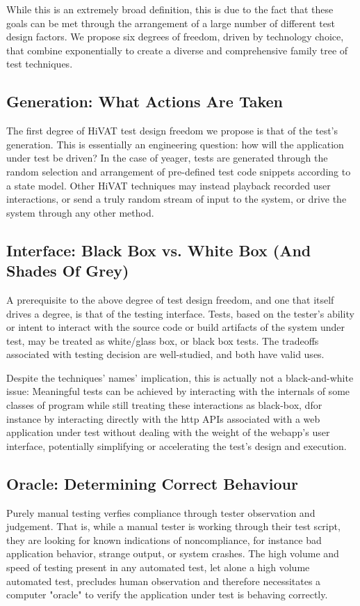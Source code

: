 While this is an extremely broad definition, this is due to the fact that these goals can be met through the arrangement of a large number of different test design factors. We propose six degrees of freedom, driven by technology choice, that combine exponentially to create a diverse and comprehensive family tree of test techniques.

\subsection{Generation: What Actions Are Taken}
The first degree of HiVAT test design freedom we propose is that of the test's generation. This is essentially an engineering question: how will the application under test be driven? In the case of yeager, tests are generated through the random selection and arrangement of pre-defined test code snippets according to a state model. Other HiVAT techniques may instead playback recorded user interactions, or send a truly random stream of input to the system, or drive the system through any other method.

\subsection{Interface: Black Box vs. White Box (And Shades Of Grey)}
A prerequisite to the above degree of test design freedom, and one that itself drives a degree, is that of the testing interface. Tests, based on the tester's ability or intent to interact with the source code or build artifacts of the system under test, may be treated as white/glass box, or black box tests. The tradeoffs associated with testing decision are well-studied, and both have valid uses.

Despite the techniques' names' implication, this is actually not a black-and-white issue: Meaningful tests can be achieved by interacting with the internals of some classes of program while still treating these interactions as black-box, dfor instance by interacting directly with the http APIs associated with a web application under test without dealing with the weight of the webapp's user interface, potentially simplifying or accelerating the test's design and execution.\citep{HoffmanTradeoffs}

\subsection{Oracle: Determining Correct Behaviour}
Purely manual testing verfies compliance through tester observation and judgement. That is, while a manual tester is working through their test script, they are looking for known indications of noncompliance, for instance bad application behavior, strange output, or system crashes. The high volume and speed of testing present in any automated test, let alone a high volume automated test, precludes human observation and therefore necessitates a computer "oracle" to verify the application under test is behaving correctly.

